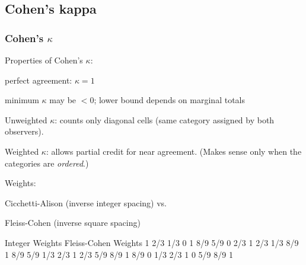 \subsection[Cohen's kappa]{Cohen's kappa}
\begin{frame}[fragile]
  \frametitle{Cohen's $\kappa$}
  \begin{itemize*}
      \item Properties of Cohen's $\kappa$:
    	\begin{itemize*}
		\item perfect agreement: \(\kappa = 1\)
		\item minimum \(\kappa\) may be \(< 0\); lower bound depends on marginal
       totals
	    \item Unweighted $\kappa$: counts only diagonal cells (same
       category assigned by both observers).
	    \item Weighted $\kappa$: allows partial credit for near agreement.
		(Makes sense only when the categories are \emph{ordered}.)
		\end{itemize*}
	  \item Weights:  
    	\begin{itemize*}
			\item Cicchetti-Alison (inverse integer spacing) vs.\
	  		\item Fleiss-Cohen (inverse square spacing)
 		\end{itemize*}
 \end{itemize*}

\begin{Output}[fontsize=\footnotesize]
       Integer Weights                 Fleiss-Cohen Weights
   1     2/3     1/3       0          1     8/9     5/9      0
 2/3       1     2/3     1/3        8/9       1     8/9    5/9
 1/3     2/3       1     2/3        5/9     8/9       1    8/9
   0     1/3     2/3       1          0     5/9     8/9      1
\end{Output}

\end{frame}

